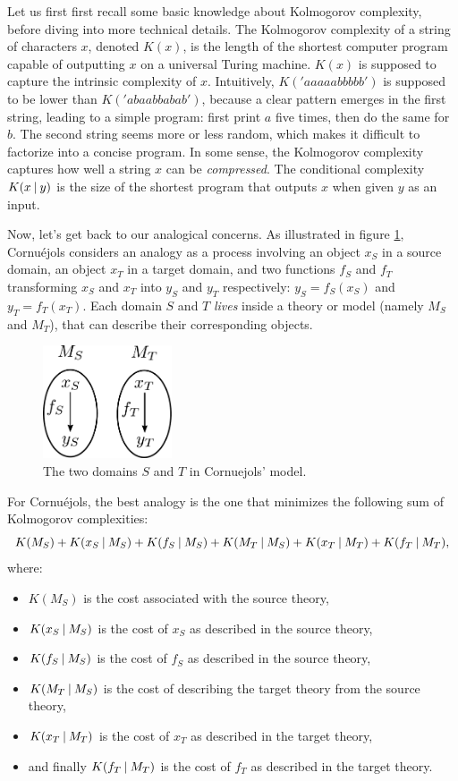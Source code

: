 Let us first first recall some basic knowledge about Kolmogorov complexity,
before diving into more technical details. The Kolmogorov complexity of a
string of characters $x$, denoted $K(x)$, is the length of the shortest
computer program capable of outputting $x$ on a universal Turing machine. $K(x)$ is supposed to capture the
intrinsic complexity of $x$. Intuitively, $K('aaaaabbbbb')$ is supposed to be
lower than $K('abaabbabab')$, because a clear pattern emerges in the first
string, leading to a simple program: first print $a$ five times, then do the
same for $b$. The second string seems more or less random, which makes it
difficult to factorize into a concise program. In some sense, the Kolmogorov
complexity captures how well a string $x$ can be \textit{compressed}. The
conditional complexity $K(x \:\vert\: y)$ is the size of the shortest program that
outputs $x$ when given $y$ as an input.

Now, let's get back to our analogical concerns. As illustrated in figure
\ref{FIG:cornuejols_model}, Cornuéjols considers an analogy as a process
involving an object $x_S$ in a source domain, an object $x_T$ in a target
domain, and two functions $f_S$ and $f_T$ transforming $x_S$ and $x_T$ into
$y_S$ and $y_T$ respectively: $y_S = f_S(x_S)$ and $y_T = f_T(x_T)$. Each
domain $S$ and $T$ \textit{lives} inside a theory or model (namely $M_S$ and
$M_T$), that can describe their corresponding objects.

\begin{figure}[!h]
\centering
\includegraphics[width=1.5in]{figures/cornuejols_model.pdf}
\caption{The two domains $S$ and $T$ in Cornuejols' model.}
\label{FIG:cornuejols_model}
\end{figure}

For Cornuéjols, the best analogy is the one that minimizes the following sum of
Kolmogorov complexities:
$$K(M_S) + K(x_S \:\vert\: M_S) + K(f_S \:\vert\: M_S) + K(M_T \:\vert\: M_S) + K(x_T
\:\vert\: M_T) + K(f_T \:\vert\: M_T),$$
where:
\begin{itemize}
   \item $K(M_S)$ is the cost associated with the source theory,
   \item $K(x_S \:\vert\: M_S)$ is the cost of $x_S$ as described in the source
     theory,
   \item $K(f_S \:\vert\: M_S)$ is the cost of $f_S$ as described in the source
     theory,
   \item $K(M_T \:\vert\: M_S)$ is the cost of describing the target theory from
     the source theory,
   \item $K(x_T \:\vert\: M_T)$ is the cost of $x_T$ as described in the target
     theory,
   \item and finally $K(f_T \:\vert\: M_T)$ is the cost of $f_T$ as described in
     the target theory.
\end{itemize}

